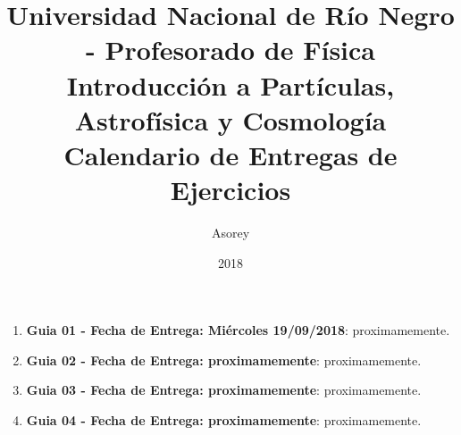 \documentclass[a4paper,12pt]{article}
\begin{document}
\title{
{\normalsize{Universidad Nacional de Río Negro - Profesorado de Física}}\\
Introducción a Partículas, Astrofísica y Cosmología\\ Calendario de Entregas de Ejercicios}
\author{Asorey}
\date{2018}
\maketitle

\begin{enumerate}
	\item {\bf{Guia 01 - Fecha de Entrega: Miércoles 19/09/2018}}: proximamemente. 
	\item {\bf{Guia 02 - Fecha de Entrega: proximamemente}}: proximamemente. 
	\item {\bf{Guia 03 - Fecha de Entrega: proximamemente}}: proximamemente. 
	\item {\bf{Guia 04 - Fecha de Entrega: proximamemente}}: proximamemente. 
\end{enumerate}
\end{document}
